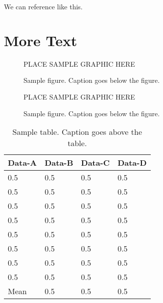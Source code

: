 \documentclass[master,dense]{thesis}
\begin{document}
We can reference  like this.

\chapter{More Text}
\label{chap:more}

\lipsum[1-10]

\begin{figure}[hp] %
    PLACE SAMPLE GRAPHIC HERE
    \caption{Sample figure.  Caption goes below the figure.}
    \label{fig:sample2}
\end{figure}
\begin{figure}[hp] %
    PLACE SAMPLE GRAPHIC HERE
    \caption{Sample figure.  Caption goes below the figure.}
    \label{fig:sample3}
\end{figure}


\begin{table*}[hp]
    \caption{Sample table.  Caption goes above the table.}
    \label{table:sample2}
    \begin{center}
        \begin{tabular}{@{}*{4}{l}} %
            \toprule
            Data-A  & Data-B    & Data-C    & Data-D \\
            \midrule
            0.5     & 0.5       & 0.5       & 0.5   \\
            0.5     & 0.5       & 0.5       & 0.5   \\
            0.5     & 0.5       & 0.5       & 0.5   \\
            0.5     & 0.5       & 0.5       & 0.5   \\
            0.5     & 0.5       & 0.5       & 0.5   \\
            0.5     & 0.5       & 0.5       & 0.5   \\
            0.5     & 0.5       & 0.5       & 0.5   \\
            0.5     & 0.5       & 0.5       & 0.5   \\
            \midrule
            Mean    & 0.5       & 0.5       & 0.5   \\
            \bottomrule
        \end{tabular}
    \end{center}
\end{table*}
\end{document}
